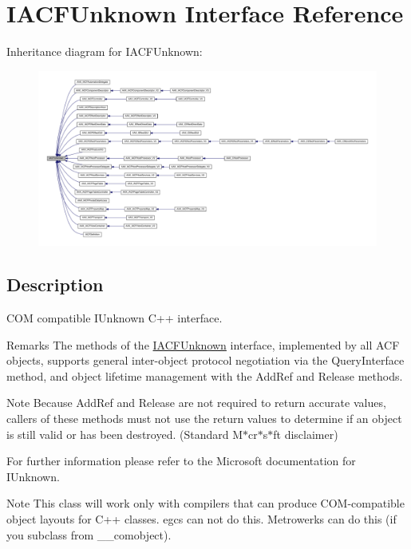 \hypertarget{a00146}{}\section{I\+A\+C\+F\+Unknown Interface Reference}
\label{a00146}


Inheritance diagram for I\+A\+C\+F\+Unknown\+:
\nopagebreak
\begin{figure}[H]
\begin{center}
\leavevmode
\includegraphics[width=350pt]{a00728}
\end{center}
\end{figure}


\subsection{Description}
C\+O\+M compatible I\+Unknown C++ interface. 

\begin{DoxyRemark}{Remarks}
The methods of the \hyperlink{a00146}{I\+A\+C\+F\+Unknown} interface, implemented by all A\+C\+F objects, supports general inter-\/object protocol negotiation via the {\ttfamily Query\+Interface} method, and object lifetime management with the Add\+Ref and Release methods.
\end{DoxyRemark}
\begin{DoxyNote}{Note}
Because Add\+Ref and Release are not required to return accurate values, callers of these methods must not use the return values to determine if an object is still valid or has been destroyed. (Standard M$\ast$cr$\ast$s$\ast$ft disclaimer)
\end{DoxyNote}
For further information please refer to the Microsoft documentation for I\+Unknown.

\begin{DoxyNote}{Note}
This class will work only with compilers that can produce C\+O\+M-\/compatible object layouts for C++ classes. egcs can not do this. Metrowerks can do this (if you subclass from \+\_\+\+\_\+comobject). 
\end{DoxyNote}

